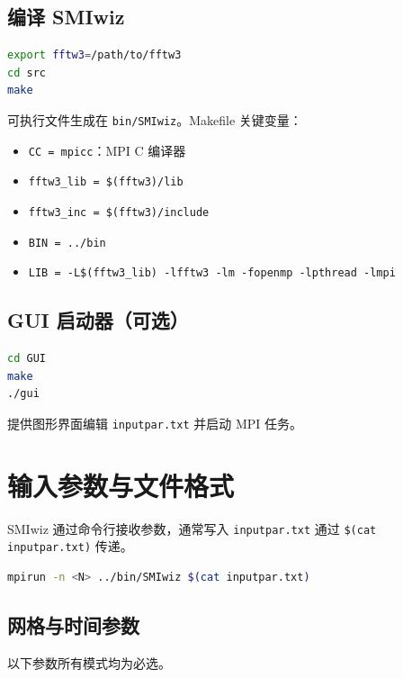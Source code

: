 \documentclass[11pt,a4paper]{ctexart}
\begin{document}
\subsection{编译 SMIwiz}

\begin{lstlisting}[language=bash]
export fftw3=/path/to/fftw3
cd src
make
\end{lstlisting}

可执行文件生成在 \texttt{bin/SMIwiz}。Makefile 关键变量：

\begin{itemize}
  \item \texttt{CC = mpicc}：MPI C 编译器
  \item \texttt{fftw3\_lib = \$(fftw3)/lib}
  \item \texttt{fftw3\_inc = \$(fftw3)/include}
  \item \texttt{BIN = ../bin}
  \item \texttt{LIB = -L\$(fftw3\_lib) -lfftw3 -lm -fopenmp -lpthread -lmpi}
\end{itemize}

\subsection{GUI 启动器（可选）}

\begin{lstlisting}[language=bash]
cd GUI
make
./gui
\end{lstlisting}

提供图形界面编辑 \texttt{inputpar.txt} 并启动 MPI 任务。

\section{输入参数与文件格式}

SMIwiz 通过命令行接收参数，通常写入 \texttt{inputpar.txt} 通过 \texttt{\$(cat inputpar.txt)} 传递。

\begin{lstlisting}[language=bash]
mpirun -n <N> ../bin/SMIwiz $(cat inputpar.txt)
\end{lstlisting}

\subsection{网格与时间参数}

以下参数所有模式均为必选。
\end{document}
